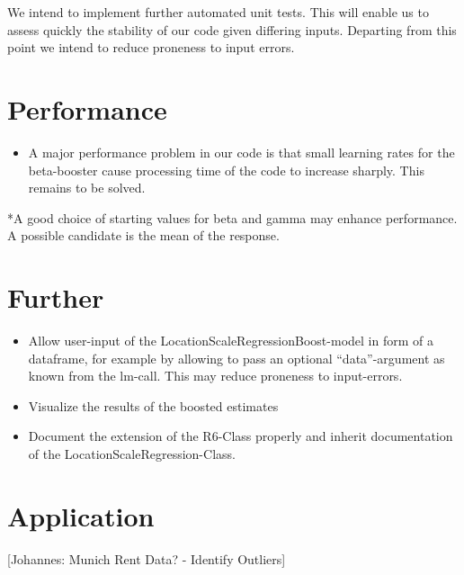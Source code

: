 \documentclass[
]{report}
\providecommand{\tightlist}{%
  \setlength{\itemsep}{0pt}\setlength{\parskip}{0pt}}
\begin{document}
We intend to implement further automated unit tests. This will enable us
to assess quickly the stability of our code given differing inputs.
Departing from this point we intend to reduce proneness to input errors.

\hypertarget{performance}{%
\section{Performance}\label{performance}}

\begin{itemize}
\tightlist
\item
  A major performance problem in our code is that small learning rates
  for the beta-booster cause processing time of the code to increase
  sharply. This remains to be solved.
\end{itemize}

*A good choice of starting values for beta and gamma may enhance
performance. A possible candidate is the mean of the response.

\hypertarget{further}{%
\section{Further}\label{further}}

\begin{itemize}
\item
  Allow user-input of the LocationScaleRegressionBoost-model in form of
  a dataframe, for example by allowing to pass an optional
  ``data''-argument as known from the lm-call. This may reduce proneness
  to input-errors.
\item
  Visualize the results of the boosted estimates
\item
  Document the extension of the R6-Class properly and inherit
  documentation of the LocationScaleRegression-Class.
\end{itemize}

\hypertarget{application}{%
\section{Application}\label{application}}

{[}Johannes: Munich Rent Data? - Identify Outliers{]}
\end{document}
